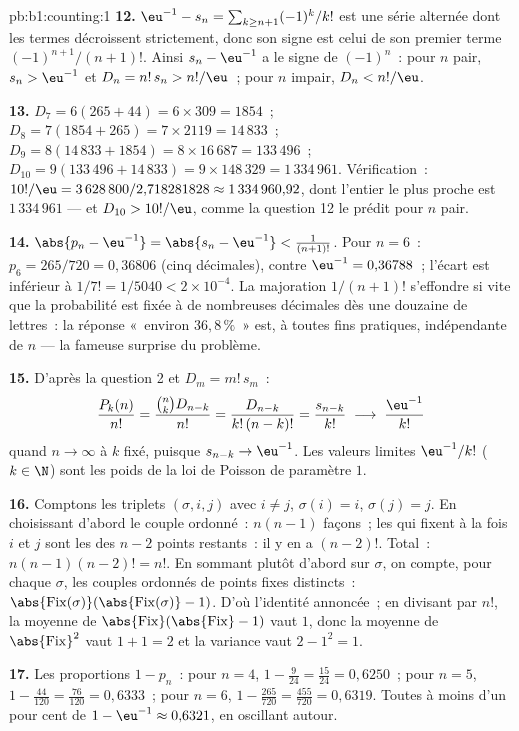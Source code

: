 \begin{solution}{pb:b1:counting:1}
\textbf{12.} $\eu^{-1} - s_n = \sum_{k \geq n+1} (-1)^k/k!$ est une
série alternée dont les termes décroissent strictement, donc son signe est
celui de son premier terme $(-1)^{n+1}/(n+1)!$. Ainsi $s_n -
\eu^{-1}$ a le signe de $(-1)^n$~: pour $n$ pair, $s_n > \eu^{-1}$
et $D_n = n!\,s_n > n!/\eu$~; pour $n$ impair, $D_n < n!/\eu$.

\textbf{13.} $D_7 = 6(265 + 44) = 6 \times 309 = 1854$~; $D_8 =
7(1854 + 265) = 7 \times 2119 = 14\,833$~; $D_9 = 8(14\,833 + 1854)
= 8 \times 16\,687 = 133\,496$~; $D_{10} = 9(133\,496 + 14\,833) =
9 \times 148\,329 = 1\,334\,961$. Vérification~: $10!/\eu = 3\,628\,800 /
2{,}718281828 \approx 1\,334\,960{,}92$, dont l'entier le plus proche est
$1\,334\,961$ --- et $D_{10} > 10!/\eu$, comme la question 12 le prédit
pour $n$ pair.

\textbf{14.} $\abs{p_n - \eu^{-1}} = \abs{s_n - \eu^{-1}} <
\frac1{(n+1)!}$. Pour $n = 6$~: $p_6 = 265/720 = 0{,}36806$ (cinq
décimales), contre $\eu^{-1} = 0{,}36788$~; l'écart est inférieur à $1/7! =
1/5040 < 2 \times 10^{-4}$. La majoration $1/(n+1)!$ s'effondre si vite
que la probabilité est fixée à de nombreuses décimales dès une douzaine
de lettres~: la réponse «~environ $36{,}8\,\%$~» est, à toutes fins
pratiques, indépendante de $n$ --- la fameuse surprise du problème.

\textbf{15.} D'après la question 2 et $D_m = m!\,s_m$~:
\[
\frac{P_k(n)}{n!} = \frac{\binom nk D_{n-k}}{n!}
= \frac{D_{n-k}}{k!\,(n-k)!} = \frac{s_{n-k}}{k!}
\;\longrightarrow\; \frac{\eu^{-1}}{k!}
\]
quand $n \to \infty$ à $k$ fixé, puisque $s_{n-k} \to \eu^{-1}$.
Les valeurs limites $\eu^{-1}/k!$ ($k \in \N$) sont les poids de la
loi de Poisson de paramètre $1$.

\textbf{16.} Comptons les triplets $(\sigma, i, j)$ avec $i \neq j$,
$\sigma(i) = i$, $\sigma(j) = j$. En choisissant d'abord le couple
ordonné~: $n(n-1)$ façons~; les  qui fixent à la fois $i$ et
$j$ sont les  des $n - 2$ points restants~: il y en a $(n-2)!$.
Total~: $n(n-1)(n-2)! = n!$. En sommant plutôt d'abord sur $\sigma$, on
compte, pour chaque $\sigma$, les couples ordonnés de points fixes
distincts~: $\abs{\mathrm{Fix}(\sigma)}(\abs{\mathrm{Fix}(\sigma)}-1)$.
D'où l'identité annoncée~; en divisant par $n!$, la moyenne de
$\abs{\mathrm{Fix}}(\abs{\mathrm{Fix}} - 1)$ vaut $1$, donc la moyenne
de $\abs{\mathrm{Fix}}^2$ vaut $1 + 1 = 2$ et la variance vaut $2 -
1^2 = 1$.

\textbf{17.} Les proportions $1 - p_n$~: pour $n = 4$, $1 - \frac
9{24} = \frac{15}{24} = 0{,}6250$~; pour $n = 5$, $1 - \frac{44}{120} =
\frac{76}{120} = 0{,}6333$~; pour $n = 6$, $1 - \frac{265}{720} =
\frac{455}{720} = 0{,}6319$. Toutes à moins d'un pour cent de
$1 - \eu^{-1} \approx 0{,}6321$, en oscillant autour.


\end{solution}
